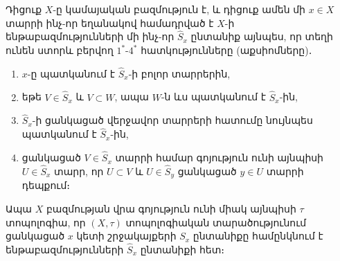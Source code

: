 \documentclass[./main.tex]{subfiles}
\begin{document}
\begin{theorem}\label{ch4thm3}
Դիցուք $X$-ը կա\-մա\-յա\-կան բազմություն է, և դիցուք ամեն մի $x\in X$ տարրի ինչ-որ եղանակով համադրված է $X$-ի ենթաբազմությունների մի ինչ-որ $\hat{S}_x$ ընտանիք այնպես, որ տեղի ունեն ստորև բերվող $1^{\ast}$-$4^{\ast}$ հատկությունները (աքսիոմները)․
\begin{enumerate}
    \item[1$^*$.]  $x$-ը պատկանում է $\hat{S}_x$-ի բոլոր տարրերին,

    \item[2$^*$.]  եթե $V\in \hat{S}_x$ և $V\subset W$, ապա $W$-ն ևս պատկանում է $\hat{S}_x$-ին,

    \item[3$^*$.]  $\hat{S}_x$-ի ցանկացած վերջավոր տարրերի հատումը նույնպես պատկանում է \linebreak $\hat{S}_x$-ին,

    \item[4$^*$.]  ցանկացած $V\in \hat{S}_x$ տարրի համար գոյություն ունի այնպիսի $U\in \hat{S}_x$ տարր, որ $U\subset V$ և $U\in \hat{S}_y$ ցանկացած $y\in U$ տարրի դեպքում։
\end{enumerate}
Ապա $X$ բազմության վրա գոյություն ունի միակ այնպիսի $\tau$ տոպոլոգիա, որ $(X, \tau )$ տոպոլոգիական տարա\-ծութ\-յունում ցանկացած $x$ կետի շրջակայքերի $S_x$ ընտանիքը համընկ\-նում է ենթաբազմու\-թյուն\-ների $\hat{S}_x$ ընտանիքի հետ։
\end{theorem}
\end{document}
